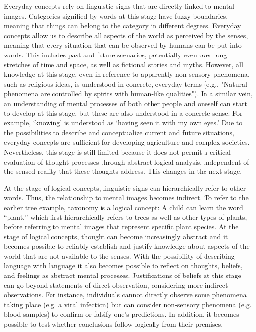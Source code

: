 \documentclass[authordate, reflection]{jote-new-article}
\begin{document}
	







	Everyday concepts rely on linguistic signs that are directly linked to mental images. Categories signified by words at this stage have fuzzy boundaries, meaning that things can belong to the category in different degrees. Everyday concepts allow us to describe all aspects of the world as perceived by the senses, meaning that every situation that can be observed by humans can be put into words. This includes past and future scenarios, potentially even over long stretches of time and space, as well as fictional stories and myths. However, all knowledge at this stage, even in reference to apparently non-sensory phenomena, such as religious ideas, is understood in concrete, everyday terms (e.g., "Natural phenomena are controlled by spirits with human-like qualities"). In a similar vein, an understanding of mental processes of both other people and oneself can start to develop at this stage, but these are also understood in a concrete sense. For example, ‘knowing' is understood as ‘having seen it with my own eyes.' Due to the possibilities to describe and conceptualize current and future situations, everyday concepts are sufficient for developing agriculture and complex societies. Nevertheless, this stage is still limited because it does not permit a critical evaluation of thought processes through abstract logical analysis, independent of the sensed reality that these thoughts address. This changes in the next stage.



	At the stage of logical concepts, linguistic signs can hierarchically refer to other words. Thus, the relationship to mental images becomes indirect. To refer to the earlier tree example, taxonomy is a logical concept: A child can learn the word “plant,” which first hierarchically refers to trees as well as other types of plants, before referring to mental images that represent specific plant species. At the stage of logical concepts, thought can become increasingly abstract and it becomes possible to reliably establish and justify knowledge about aspects of the world that are not available to the senses. With the possibility of describing language with language it also becomes possible to reflect on thoughts, beliefs, and feelings as abstract mental processes. Justifications of beliefs at this stage can go beyond statements of direct observation, considering more indirect observations. For instance, individuals cannot directly observe some phenomena taking place (e.g. a viral infection) but can consider non-sensory phenomena (e.g. blood samples) to confirm or falsify one's predictions. In addition, it becomes possible to test whether conclusions follow logically from their premises.
\end{document}
